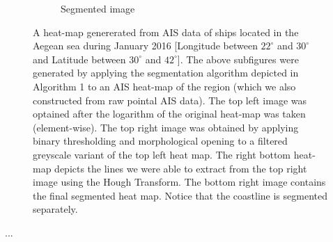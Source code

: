 \documentclass{article}
\begin{document}
\begin{figure}[h]
\begin{subfigure}[b]{0.5\linewidth}
    \caption{Segmented image} 
    \label{fig7:d} 
  \end{subfigure} 
  \caption{A heat-map genererated from AIS data of ships located in the Aegean sea during January 2016 [Longitude between $22^{\circ}$ and $30^{\circ}$ and Latitude between $30^{\circ}$ and $42^{\circ}$]. The above subfigures were generated by applying the segmentation algorithm depicted in Algorithm 1 to an AIS heat-map of the region (which we also constructed from raw pointal AIS data). The top left image was optained after the logarithm of the original heat-map was taken (element-wise). The top right image 
  was obtained by applying binary thresholding and morphological opening to a filtered greyscale variant of the top left heat map. The right bottom heat-map depicts the lines we were able to extract 
  from the top right image using the Hough Transform. The bottom right image contains the final segmented heat map. Notice that the coastline is segmented separately.}
  \label{fig7} 
\end{figure}

...
\end{document}
